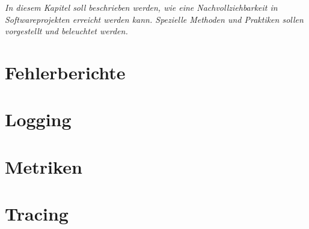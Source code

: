 
\textit{In diesem Kapitel soll beschrieben werden, wie eine Nachvollziehbarkeit in Softwareprojekten erreicht werden kann. Spezielle Methoden und Praktiken sollen vorgestellt und beleuchtet werden.}

\section{Fehlerberichte}

\section{Logging}

\section{Metriken}

\section{Tracing}